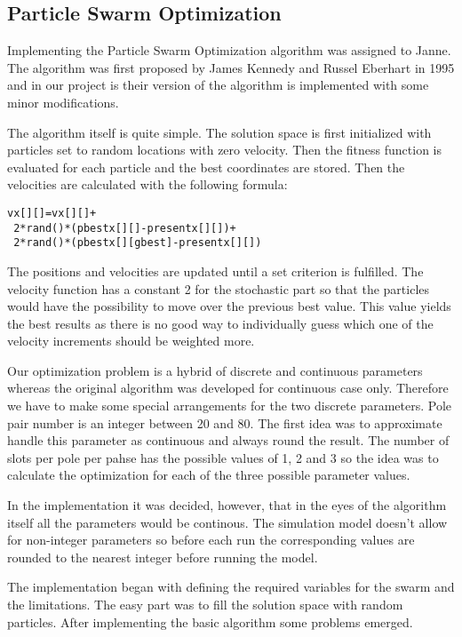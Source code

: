 \documentclass[twoside]{article}
\begin{document}
\begin{multicols}{2}
\section{Particle Swarm Optimization}

Implementing the Particle Swarm Optimization algorithm was assigned to Janne. The algorithm was first proposed by James Kennedy and Russel Eberhart in 1995 and in our project is their version of the algorithm is implemented with some minor modifications.

The algorithm itself is quite simple. The solution space is first initialized with particles set to random locations with zero velocity. Then the fitness function is evaluated for each particle and the best coordinates are stored. Then the velocities are calculated with the following formula: \cite{pso}
\begin{verbatim}
vx[][]=vx[][]+
 2*rand()*(pbestx[][]-presentx[][])+
 2*rand()*(pbestx[][gbest]-presentx[][])
\end{verbatim}
	
The positions and velocities are updated until a set criterion is fulfilled. The velocity function has a constant 2 for the stochastic part so that the particles would have the possibility to move over the previous best value. This value yields the best results as there is no good way to individually guess which one of the velocity increments should be weighted more. \cite{pso} 
	
	Our optimization problem is a hybrid of discrete and continuous parameters whereas the original algorithm was developed for continuous case only. Therefore we have to make some special arrangements for the two discrete parameters. Pole pair number is an integer between 20 and 80. The first idea was to approximate handle this parameter as continuous and always round the result. The number of slots per pole per pahse has the possible values of 1, 2 and 3 so the idea was to calculate the optimization for each of the three possible parameter values.
	
	In the implementation it was decided, however, that in the eyes of the algorithm itself all the parameters would be continous. The simulation model doesn't allow for non-integer parameters so before each run the corresponding values are rounded to the nearest integer before running the model.
	
	The implementation began with defining the required variables for the swarm and the limitations. The easy part was to fill the solution space with random particles. After implementing the basic algorithm some problems emerged.
	

\end{multicols}
\end{document}
